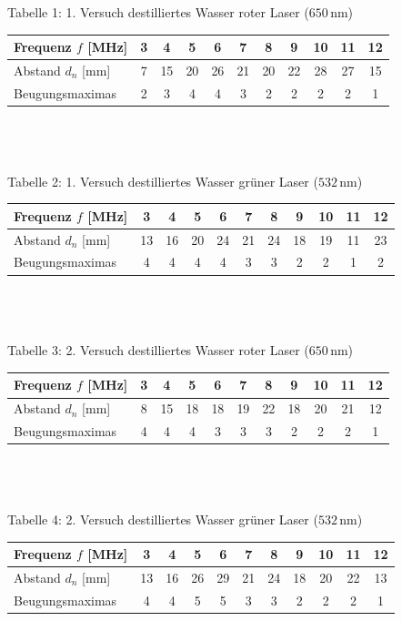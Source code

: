\documentclass[fontsize=12pt]{scrartcl}
\begin{document}
Tabelle 1: 1. Versuch destilliertes Wasser roter Laser ($650$\,nm) \\
\begin{tabular}{|l|c|c|c|c|c|c|c|c|c|c|} \hline
Frequenz $f$ [MHz] & 3 & 4 & 5 & 6 & 7 & 8 & 9 & 10 & 11 & 12\\ \hline
Abstand $d_n$ [mm] & 7 & 15 & 20 & 26 & 21 & 20 & 22 & 28 & 27 & 15 \\ \hline
Beugungsmaximas & 2 & 3 & 4 & 4 & 3 & 2 & 2 & 2 & 2 & 1 \\ \hline 
\end{tabular} \\
~\\
~\\
Tabelle 2: 1. Versuch destilliertes Wasser grüner Laser ($532$\,nm) \\
\begin{tabular}{|l|c|c|c|c|c|c|c|c|c|c|} \hline
Frequenz $f$ [MHz] & 3 & 4 & 5 & 6 & 7 & 8 & 9 & 10 & 11 & 12\\ \hline
Abstand $d_n$ [mm] & 13 & 16 & 20 & 24 & 21 & 24 & 18 & 19 & 11 & 23 \\ \hline
Beugungsmaximas & 4 & 4 & 4 & 4 & 3 & 3 & 2 & 2 & 1 & 2 \\ \hline 
\end{tabular} \\
~\\
~\\
Tabelle 3: 2. Versuch destilliertes Wasser roter Laser ($650$\,nm) \\
\begin{tabular}{|l|c|c|c|c|c|c|c|c|c|c|} \hline
Frequenz $f$ [MHz] & 3 & 4 & 5 & 6 & 7 & 8 & 9 & 10 & 11 & 12\\ \hline
Abstand $d_n$ [mm] & 8 & 15 & 18 & 18 & 19 & 22 & 18 & 20 & 21 & 12 \\ \hline
Beugungsmaximas & 4 & 4 & 4 & 3 & 3 & 3 & 2 & 2 & 2 & 1 \\ \hline 
\end{tabular} \\
~\\
~\\
Tabelle 4: 2. Versuch destilliertes Wasser grüner Laser ($532$\,nm) \\
\begin{tabular}{|l|c|c|c|c|c|c|c|c|c|c|} \hline
Frequenz $f$ [MHz] & 3 & 4 & 5 & 6 & 7 & 8 & 9 & 10 & 11 & 12\\ \hline
Abstand $d_n$ [mm] & 13 & 16 & 26 & 29 & 21 & 24 & 18 & 20 & 22 & 13 \\ \hline
Beugungsmaximas & 4 & 4 & 5 & 5 & 3 & 3 & 2 & 2 & 2 & 1 \\ \hline 
\end{tabular} \\
\end{document}
